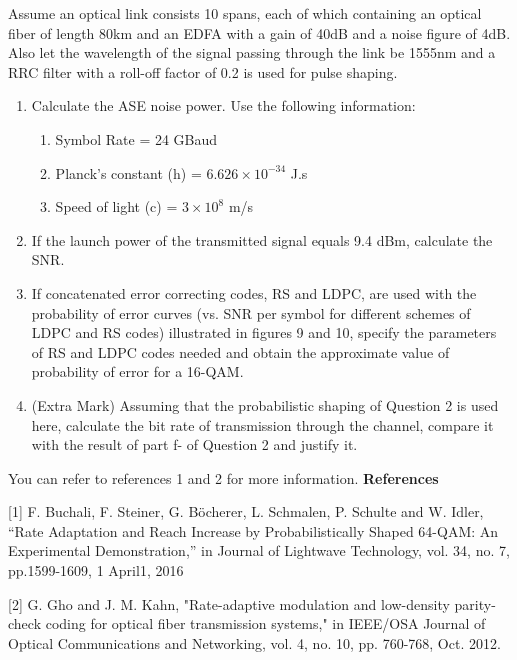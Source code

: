 \documentclass[10pt,letterpaper]{article}
\newcommand{\nl}{\newline\newline}
\begin{document}
Assume an optical link consists 10 spans, each of which containing an optical fiber of length 80km and an EDFA with a gain of 40dB and a noise figure of 4dB. Also let the wavelength of the signal passing through the link be 1555nm and a RRC filter with a roll-off factor of 0.2 is used for pulse shaping.
\begin{enumerate}[label=\alph*-]
\item
Calculate the ASE noise power. Use the following information:
\begin{enumerate}[label=$\bullet$]
\item
Symbol Rate = 24 GBaud
\item
Planck's constant (h) = $6.626 \times 10 ^ {-34}$ J.s
\item
Speed of light (c) = $3\times10 ^ {8}$ m/s    
\end{enumerate}
\item
If the launch power of the transmitted signal equals 9.4 dBm, calculate the SNR.
\item
If concatenated error correcting codes, RS and LDPC, are used with the probability of error curves (vs. SNR per symbol for different schemes of LDPC and RS codes) illustrated in figures 9 and 10, specify the parameters of RS and LDPC codes needed and obtain the approximate value of probability of error for a 16-QAM.
\item (Extra Mark)
Assuming that the probabilistic shaping of Question 2 is used here, calculate the bit rate of transmission through the channel, compare it with the result of part f- of Question 2 and justify it.
\end{enumerate}
You can refer to references 1 and 2 for more information.\nl
{}
\newpage
\textbf{References}

[1] F. Buchali, F. Steiner, G. Böcherer, L. Schmalen, P. Schulte and W. Idler, “Rate   Adaptation and Reach Increase by Probabilistically Shaped 64-QAM: An Experimental Demonstration,” in Journal of Lightwave Technology, vol. 34, no. 7, pp.1599-1609, 1 April1, 2016

[2] G. Gho and J. M. Kahn, "Rate-adaptive modulation and low-density parity-check coding for  optical fiber transmission systems," in IEEE/OSA Journal of Optical Communications and Networking, vol. 4, no. 10, pp. 760-768, Oct. 2012.
\end{document}
